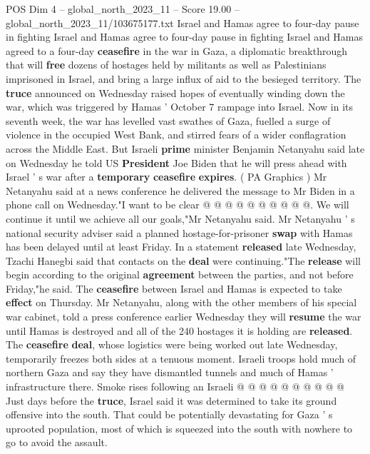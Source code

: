 \begin{textsample}{POS Dim 4 – global\_north\_2023\_11 – Score 19.00 – global\_north\_2023\_11/103675177.txt}  \label{ex:f4_pos_277}
Israel and Hamas agree to four-day pause in fighting Israel and Hamas agree to four-day pause in fighting Israel and Hamas agreed to a four-day \textbf{ceasefire} in the war in Gaza, a diplomatic breakthrough that will \textbf{free} dozens of hostages held by militants as well as Palestinians imprisoned in Israel, and bring a large influx of aid to the besieged territory.
The \textbf{truce} announced on Wednesday raised hopes of eventually winding down the war, which was triggered by Hamas ' October 7 rampage into Israel.
Now in its seventh week, the war has levelled vast swathes of Gaza, fuelled a surge of violence in the occupied West Bank, and stirred fears of a wider conflagration across the Middle East.
But Israeli \textbf{prime} minister Benjamin Netanyahu said late on Wednesday he told US \textbf{President} Joe Biden that he will press ahead with Israel ' s war after a \textbf{temporary} \textbf{ceasefire} \textbf{expires}. ( PA Graphics ) Mr Netanyahu said at a news conference he delivered the message to Mr Biden in a phone call on Wednesday."I want to be clear @ @ @ @ @ @ @ @ @ @.
We will continue it until we achieve all our goals,"Mr Netanyahu said.
Mr Netanyahu ' s national security adviser said a planned hostage-for-prisoner \textbf{swap} with Hamas has been delayed until at least Friday.
In a statement \textbf{released} late Wednesday, Tzachi Hanegbi said that contacts on the \textbf{deal} were continuing."The \textbf{release} will begin according to the original \textbf{agreement} between the parties, and not before Friday,"he said.
The \textbf{ceasefire} between Israel and Hamas is expected to take \textbf{effect} on Thursday.
Mr Netanyahu, along with the other members of his special war cabinet, told a press conference earlier Wednesday they will \textbf{resume} the war until Hamas is destroyed and all of the 240 hostages it is holding are \textbf{released}.
The \textbf{ceasefire} \textbf{deal}, whose logistics were being worked out late Wednesday, temporarily freezes both sides at a tenuous moment.
Israeli troops hold much of northern Gaza and say they have dismantled tunnels and much of Hamas ' infrastructure there.
Smoke rises following an Israeli @ @ @ @ @ @ @ @ @ @ Just days before the \textbf{truce}, Israel said it was determined to take its ground offensive into the south.
That could be potentially devastating for Gaza ' s uprooted population, most of which is squeezed into the south with nowhere to go to avoid the assault.

\end{textsample}
